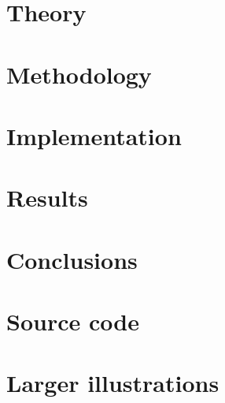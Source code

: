 \documentclass[12pt]{report}
\begin{document}
\chapter{Theory}
    
    \newpage
\chapter{Methodology}
    
    \newpage
\chapter{Implementation}
    
    \newpage
\chapter{Results}
    
    \newpage
\chapter{Conclusions}
    


\newpage
\renewcommand{\bibname}{\hspace*{42pt}References}
 


\appendix
\begin{appendices}
\chapter{Source code}
    
\chapter{Larger illustrations}
\end{appendices}
\end{document}
